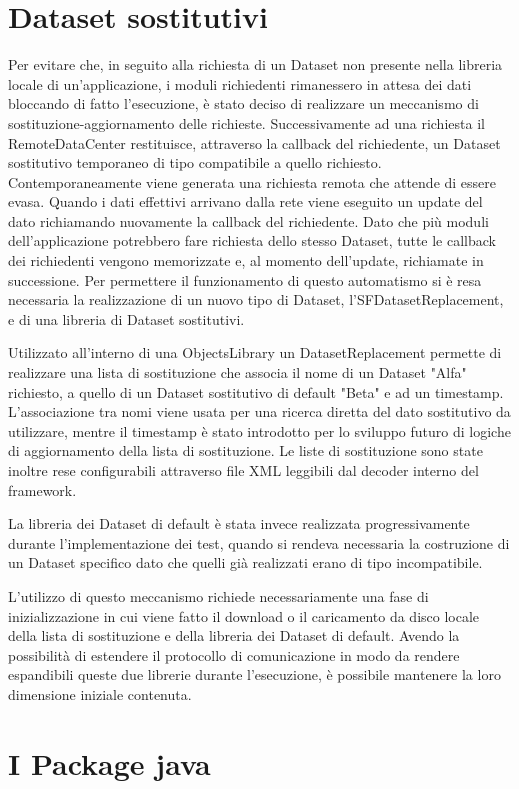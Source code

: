 \section{Dataset sostitutivi}
\label{sec:dataset_sost}
Per evitare che, in seguito alla richiesta di un Dataset non presente nella libreria locale di un'applicazione, i moduli richiedenti rimanessero in attesa dei dati bloccando di fatto l'esecuzione, è stato deciso di realizzare un meccanismo di sostituzione-aggiornamento delle richieste.
Successivamente ad una richiesta il RemoteDataCenter restituisce, attraverso la callback del richiedente, un Dataset sostitutivo temporaneo di tipo compatibile a quello richiesto.
Contemporaneamente viene generata una richiesta remota che attende di essere evasa. Quando i dati effettivi arrivano dalla rete viene eseguito un update del dato richiamando nuovamente la callback del richiedente.
Dato che più moduli dell'applicazione potrebbero fare richiesta dello stesso Dataset, tutte le callback dei richiedenti vengono memorizzate e, al momento dell'update, richiamate in successione.
Per permettere il funzionamento di questo automatismo si è resa necessaria la realizzazione di un nuovo tipo di Dataset, l'SFDatasetReplacement, e di una libreria di Dataset sostitutivi.

Utilizzato all'interno di una ObjectsLibrary un DatasetReplacement permette di realizzare una lista di sostituzione che associa il nome di un Dataset "Alfa" richiesto, a quello di un Dataset sostitutivo di default "Beta" e ad un timestamp.
L'associazione tra nomi viene usata per una ricerca diretta del dato sostitutivo da utilizzare, mentre il timestamp è stato introdotto per lo sviluppo futuro di logiche di aggiornamento della lista di sostituzione.
Le liste di sostituzione sono state inoltre rese configurabili attraverso file XML leggibili dal decoder interno del framework.

La libreria dei Dataset di default è stata invece realizzata progressivamente durante l'implementazione dei test, quando si rendeva necessaria la costruzione di un Dataset specifico dato che quelli già realizzati erano di tipo incompatibile.

L'utilizzo di questo meccanismo richiede necessariamente una fase di inizializzazione in cui viene fatto il download o il caricamento da disco locale della lista di sostituzione e della libreria dei Dataset di default. Avendo la possibilità di estendere il protocollo di comunicazione in modo da rendere espandibili queste due librerie durante l'esecuzione, è possibile mantenere la loro dimensione iniziale contenuta.


\section{I Package java} 
\label{sec:sfrc_packages}
